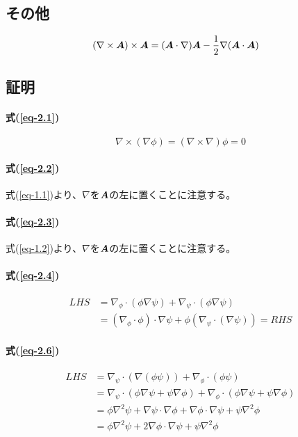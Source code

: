 \documentclass[a4paper,uplatex,dvi=dvipdfmx,ja=standard]{bxjsarticle}
\newcommand{\bm}[1]{{\mbox{\boldmath $#1$}}}
\numberwithin{equation}{section}
\begin{document}
\subsection{その他}
\begin{align}
  & (\nabla\times\bm{A})\times\bm{A}=(\bm{A}\cdot\nabla)\bm{A}-\frac{1}{2}\nabla(\bm{A}\cdot\bm{A}) \label{eq-2.19}
\end{align}

\subsection{証明}
\paragraph{式(\ref{eq-2.1})}
\begin{equation*}
  \nabla\times(\nabla\phi)=(\nabla\times\nabla)\phi=0
\end{equation*}
\paragraph{式(\ref{eq-2.2})}
式(\ref{eq-1.1})より、$\nabla$を$\bm{A}$の左に置くことに注意する。
\paragraph{式(\ref{eq-2.3})}
式(\ref{eq-1.2})より、$\nabla$を$\bm{A}$の左に置くことに注意する。
\paragraph{式(\ref{eq-2.4})}
\begin{align*}
  LHS &= \nabla_\phi\cdot(\phi\nabla\psi)+\nabla_\psi\cdot(\phi\nabla\psi) \\
  &= (\nabla_\phi\cdot\phi)\cdot\nabla\psi+\phi(\nabla_\psi\cdot(\nabla\psi))=RHS
\end{align*}
\paragraph{式(\ref{eq-2.6})}
\begin{align*}
  LHS &= \nabla_\psi\cdot(\nabla(\phi\psi))+\nabla_\phi\cdot(\phi\psi) \\
  &= \nabla_\psi\cdot(\phi\nabla\psi+\psi\nabla\phi)+\nabla_\phi\cdot(\phi\nabla\psi+\psi\nabla\phi) \\
  &= \phi\nabla^2\psi+\nabla\psi\cdot\nabla\phi+\nabla\phi\cdot\nabla\psi+\psi\nabla^2\phi \\
  &= \phi\nabla^2\psi+2\nabla\phi\cdot\nabla\psi+\psi\nabla^2\phi
\end{align*}
\end{document}

